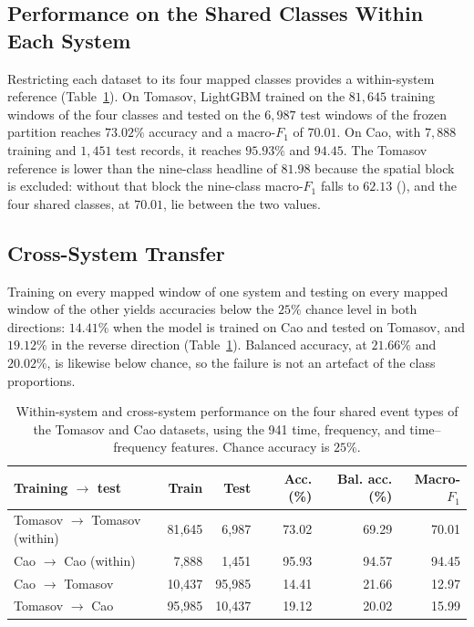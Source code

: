 \subsection{Performance on the Shared Classes Within Each System}
\label{sec:resMappingWithin}
Restricting each dataset to its four mapped classes provides a within-system reference (Table~\ref{tab:transfer}). On Tomasov, LightGBM trained on the $81{,}645$ training windows of the four classes and tested on the $6{,}987$ test windows of the frozen partition reaches $73.02\%$ accuracy and a macro-$F_1$ of $70.01$. On Cao, with $7{,}888$ training and $1{,}451$ test records, it reaches $95.93\%$ and $94.45$. The Tomasov reference is lower than the nine-class headline of $81.98$ because the spatial block is excluded: without that block the nine-class macro-$F_1$ falls to $62.13$ (), and the four shared classes, at $70.01$, lie between the two values.

\subsection{Cross-System Transfer}
\label{sec:resTransfer}
Training on every mapped window of one system and testing on every mapped window of the other yields accuracies below the $25\%$ chance level in both directions: $14.41\%$ when the model is trained on Cao and tested on Tomasov, and $19.12\%$ in the reverse direction (Table~\ref{tab:transfer}). Balanced accuracy, at $21.66\%$ and $20.02\%$, is likewise below chance, so the failure is not an artefact of the class proportions.

\begin{table}[!htbp]
	\centering
	\caption{Within-system and cross-system performance on the four shared event types of the Tomasov and Cao datasets, using the 941 time, frequency, and time--frequency features. Chance accuracy is $25\%$.}
	\label{tab:transfer}
	\small
	\begin{tabular}{@{}lrrrrr@{}}
		\toprule
		\textbf{Training $\rightarrow$ test} & \textbf{Train} & \textbf{Test} & \textbf{Acc. (\%)} & \textbf{Bal. acc. (\%)} & \textbf{Macro-$F_1$}\\
		\midrule
		Tomasov $\rightarrow$ Tomasov (within) & 81{,}645 & 6{,}987  & 73.02 & 69.29 & 70.01\\
		Cao $\rightarrow$ Cao (within)         & 7{,}888  & 1{,}451  & 95.93 & 94.57 & 94.45\\
		\midrule
		Cao $\rightarrow$ Tomasov              & 10{,}437 & 95{,}985 & 14.41 & 21.66 & 12.97\\
		Tomasov $\rightarrow$ Cao              & 95{,}985 & 10{,}437 & 19.12 & 20.02 & 15.99\\
		\bottomrule
	\end{tabular}
\end{table}

